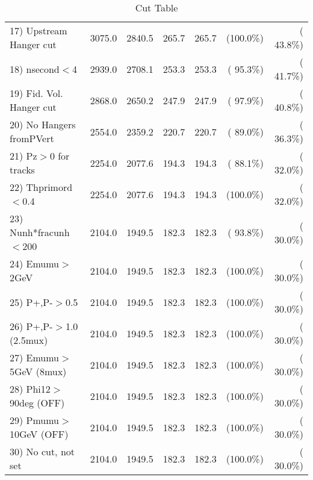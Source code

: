 \begin{table}[h!]
\begin{tabular}{||l||r|r|r|r|r|r||}
 17) Upstream Hanger cut  &       3075.0 &       2840.5 &        265.7 &        265.7 & (100.0\%) & ( 43.8\%) \\
 18) nsecond$<$4          &       2939.0 &       2708.1 &        253.3 &        253.3 & ( 95.3\%) & ( 41.7\%) \\
 19) Fid. Vol. Hanger cut &       2868.0 &       2650.2 &        247.9 &        247.9 & ( 97.9\%) & ( 40.8\%) \\
 20) No Hangers fromPVert &       2554.0 &       2359.2 &        220.7 &        220.7 & ( 89.0\%) & ( 36.3\%) \\
 21) Pz$>$0 for tracks    &       2254.0 &       2077.6 &        194.3 &        194.3 & ( 88.1\%) & ( 32.0\%) \\
 22) Thprimord$<$0.4      &       2254.0 &       2077.6 &        194.3 &        194.3 & (100.0\%) & ( 32.0\%) \\
 23) Nunh*fracunh$<$200   &       2104.0 &       1949.5 &        182.3 &        182.3 & ( 93.8\%) & ( 30.0\%) \\
 24) Emumu$>$2GeV         &       2104.0 &       1949.5 &        182.3 &        182.3 & (100.0\%) & ( 30.0\%) \\
 25) P+,P-$>$0.5          &       2104.0 &       1949.5 &        182.3 &        182.3 & (100.0\%) & ( 30.0\%) \\
 26) P+,P-$>$1.0 (2.5mux) &       2104.0 &       1949.5 &        182.3 &        182.3 & (100.0\%) & ( 30.0\%) \\
 27) Emumu$>$5GeV  (8mux) &       2104.0 &       1949.5 &        182.3 &        182.3 & (100.0\%) & ( 30.0\%) \\
 28) Phi12$>$90deg  (OFF) &       2104.0 &       1949.5 &        182.3 &        182.3 & (100.0\%) & ( 30.0\%) \\
 29) Pmumu$>$10GeV  (OFF) &       2104.0 &       1949.5 &        182.3 &        182.3 & (100.0\%) & ( 30.0\%) \\
 30) No cut, not set      &       2104.0 &       1949.5 &        182.3 &        182.3 & (100.0\%) & ( 30.0\%) \\
 \hline
 \hline
 \end{tabular}
 \caption{Cut Table           }
 \label{tab-cutcohjpsi-mumu_anumucc}
 \end{table}
